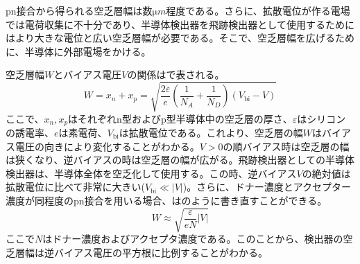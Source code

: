 pn接合から得られる空乏層幅は数$\si{\micro m}$程度である。さらに、拡散電位が作る電場では電荷収集に不十分であり、半導体検出器を飛跡検出器として使用するためにはより大きな電位と広い空乏層幅が必要である。そこで、空乏層幅を広げるために、半導体に外部電場をかける。

空乏層幅$W$とバイアス電圧$V$の関係はで表される。
\begin{equation}
  \label{eq:kuubousouhaba}
  W = x_n + x_p = \sqrt{\frac{2\varepsilon}{e}\left( \frac{1}{N_A} + \frac{1}{N_D} \right)(V_\mathrm{bi}-V) }
\end{equation}
ここで、$x_n, x_p$はそれぞれn型およびp型半導体中の空乏層の厚さ、$\varepsilon$はシリコンの誘電率、$e$は素電荷、$V_\mathrm{bi}$は拡散電位である。これより、空乏層の幅$W$はバイアス電圧の向きにより変化することがわかる。$V>0$の順バイアス時は空乏層の幅は狭くなり、逆バイアスの時は空乏層の幅が広がる。飛跡検出器としての半導体検出器は、半導体全体を空乏化して使用する。この時、逆バイアス$V$の絶対値は拡散電位に比べて非常に大きい($V_\mathrm{bi}\ll |V|$)。さらに、ドナー濃度とアクセプター濃度が同程度のpn接合を用いる場合、はのように書き直すことができる。
\begin{equation}
  \label{eq:kennshutukikuubousou}
  W \approx \sqrt{\frac{\varepsilon }{eN}|V|}
\end{equation}
ここで$N$はドナー濃度およびアクセプタ濃度である。このことから、検出器の空乏層幅は逆バイアス電圧の平方根に比例することがわかる。

